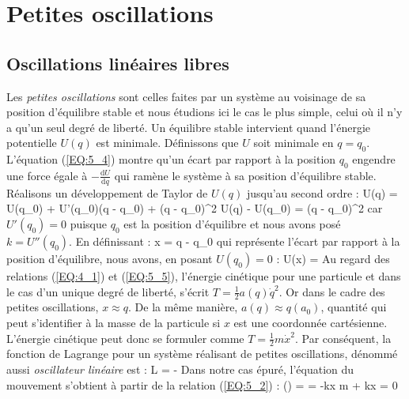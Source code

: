 \chapter{Petites oscillations}

\section{Oscillations lin\'eaires libres}\label{PAR:21}

Les \emph{petites oscillations} sont celles faites par un syst\`eme au voisinage de sa position d'\'equilibre stable et nous étudions ici le cas le plus simple, celui où il n'y a qu'un seul degr\'e de libert\'e. Un \'equilibre stable intervient quand l'\'energie potentielle $U(q)$ est minimale. D\'efinissons que $U$ soit minimale en $q = q_{0}$. L'\'equation (\ref{EQ:5_4}) montre qu'un \'ecart par rapport \`a la position $q_{0}$ engendre une force \'egale \`a $-\frac{\mathrm{d}U}{\mathrm{d}q}$ qui ram\`ene le syst\`eme \`a sa position d'\'equilibre stable. R\'ealisons un d\'eveloppement de Taylor de $U(q)$ jusqu'au second ordre :
\benn
	U(q) = U(q_{0}) + U'(q_{0})(q - q_{0}) + (q - q_{0})^{2} \Rightarrow U(q) - U(q_{0}) = (q - q_{0})^{2}
\eenn
car $U'(q_{0}) = 0$ puisque $q_{0}$ est la position d'\'equilibre et nous avons pos\'e $k = U''(q_{0})$. En d\'efinissant :
\be
	x = q - q_{0} \label{EQ:21_1}
\ee
qui repr\'esente l'\'ecart par rapport \`a la position d'\'equilibre, nous avons, en posant $U(q_{0}) = 0$ :
\be
	U(x) =  \label{EQ:21_2}
\ee
Au regard des relations (\ref{EQ:4_1}) et (\ref{EQ:5_5}), l'\'energie cin\'etique pour une particule et dans le cas d'un unique degr\'e de libert\'e, s'\'ecrit $T = \frac{1}{2}a(q)\dot{q}^{2}$. Or dans le cadre des petites oscillations, $x \approx q$. De la m\^eme mani\`ere, $a(q) \approx q(a_{0})$, quantit\'e qui peut s'identifier \`a la masse de la particule si $x$ est une coordonn\'ee cart\'esienne. L'\'energie cin\'etique peut donc se formuler comme $T = \frac{1}{2}m\dot{x}^{2}$. Par cons\'equent, la fonction de Lagrange pour un syst\`eme r\'ealisant de petites oscillations, d\'enomm\'e aussi \emph{oscillateur lin\'eaire} est :
\be
	L =  -  \label{EQ:21_3}
\ee
Dans notre cas \'epur\'e, l'\'equation du mouvement s'obtient \`a partir de la relation (\ref{EQ:5_2}) :
\be
	\left(\right) =  \Leftrightarrow {} = -kx \Leftrightarrow m + kx = 0 \label{EQ:21_4}
